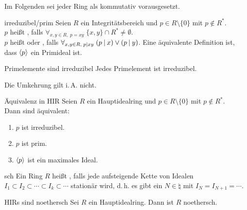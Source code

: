 \begin{Bem}
    Im Folgenden sei jeder Ring als kommutativ vorausgesetzt.
\end{Bem}

\begin{Def}{irreduzibel/prim}
    Seien $R$ ein Integritätsbereich und $p \in R \setminus \{0\}$ mit
    $p \notin R^\ast$.\\
    $p$ heißt , falls
    $\forall_{x, y \in R,\; p = xy}\; \{x, y\} \cap R^\ast \not= \emptyset$.\\
    $p$ heißt  oder , falls
    $\forall_{x, y \in R,\; p \mathbin{|} xy}\; (p \mathbin{|} x) \lor (p \mathbin{|} y)$.
    Eine äquivalente Definition ist, dass $\left\langle p\right\rangle$ ein Primideal ist.
\end{Def}

\begin{Lemma}{Primelemente sind irreduzibel}
    Jedes Primelement ist irreduzibel.
\end{Lemma}

\begin{Bem}
    Die Umkehrung gilt i.\,A. nicht.
\end{Bem}

\begin{Prop}{Äquivalenz in HIR}
    Seien $R$ ein Hauptidealring und $p \in R \setminus \{0\}$ mit
    $p \notin R^\ast$.\\
    Dann sind äquivalent:
    \begin{enumerate}[label=(\alph*)]
        \item
        $p$ ist irreduzibel.

        \item
        $p$ ist prim.

        \item
        $\left\langle p\right\rangle$ ist ein maximales Ideal.
    \end{enumerate}
\end{Prop}

\linie

\begin{Def}{sch}
    Ein Ring $R$ heißt , falls
    jede aufsteigende Kette von Idealen
    $I_1 \subset I_2 \subset \dotsb \subset I_k \subset \dotsb$
    stationär wird, d.\,h. es gibt ein $N \in \natural$ mit
    $I_N = I_{N+1} = \dotsb$.
\end{Def}

\begin{Lemma}{HIRs sind noethersch}
    Sei $R$ ein Hauptidealring.
    Dann ist $R$ noethersch.
\end{Lemma}

